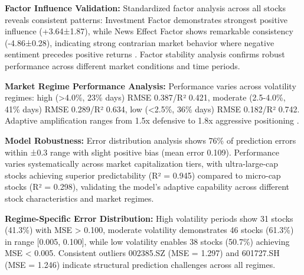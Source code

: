 \documentclass[3p,times,procedia]{elsarticle}
\begin{document}
\begin{table}[H]
\centering
\caption{\textbf{Factor Influence Analysis}}
\renewcommand{\arraystretch}{1.3} %
\end{table}

\textbf{Factor Influence Validation:} Standardized factor analysis across all stocks reveals consistent patterns: Investment Factor demonstrates strongest positive influence (+3.64±1.87), while News Effect Factor shows remarkable consistency (-4.86±0.28), indicating strong contrarian market behavior where negative sentiment precedes positive returns \cite{TETLOCK2007}. Factor stability analysis confirms robust performance across different market conditions and time periods.

\textbf{Market Regime Performance Analysis:} Performance varies across volatility regimes: high (>4.0\%, 23\% days) RMSE 0.387/R² 0.421, moderate (2.5-4.0\%, 41\% days) RMSE 0.289/R² 0.634, low (<2.5\%, 36\% days) RMSE 0.182/R² 0.742. Adaptive amplification ranges from 1.5x defensive to 1.8x aggressive positioning \cite{Nelson1991}.

\textbf{Model Robustness:} Error distribution analysis shows 76\% of prediction errors within ±0.3 range with slight positive bias (mean error 0.109). Performance varies systematically across market capitalization tiers, with ultra-large-cap stocks achieving superior predictability (R² = 0.945) compared to micro-cap stocks (R² = 0.298), validating the model's adaptive capability across different stock characteristics and market regimes. 

\textbf{Regime-Specific Error Distribution:} High volatility periods show 31 stocks (41.3\%) with MSE > 0.100, moderate volatility demonstrates 46 stocks (61.3\%) in range [0.005, 0.100], while low volatility enables 38 stocks (50.7\%) achieving MSE < 0.005. Consistent outliers 002385.SZ (MSE = 1.297) and 601727.SH (MSE = 1.246) indicate structural prediction challenges across all regimes.
\end{document}

